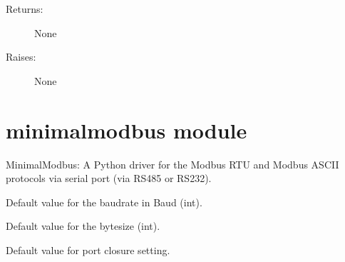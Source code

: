 \documentclass[letterpaper,10pt,english]{sphinxmanual}
\begin{document}
\begin{fulllineitems}
\begin{fulllineitems}
\begin{description}
\begin{itemize}
\end{itemize}

\item[{Returns:}] \leavevmode
None

\item[{Raises:}] \leavevmode
None

\end{description}

\end{fulllineitems}


\end{fulllineitems}



\section{minimalmodbus module}
\label{minimalmodbus:module-minimalmodbus}\label{minimalmodbus::doc}\label{minimalmodbus:minimalmodbus-module}
MinimalModbus: A Python driver for the Modbus RTU and Modbus ASCII protocols via serial port (via RS485 or RS232).

\begin{fulllineitems}
\label{minimalmodbus:minimalmodbus.BAUDRATE}
Default value for the baudrate in Baud (int).

\end{fulllineitems}


\begin{fulllineitems}
\label{minimalmodbus:minimalmodbus.BYTESIZE}
Default value for the bytesize (int).

\end{fulllineitems}


\begin{fulllineitems}
\label{minimalmodbus:minimalmodbus.CLOSE_PORT_AFTER_EACH_CALL}
Default value for port closure setting.

\end{fulllineitems}

\end{document}
